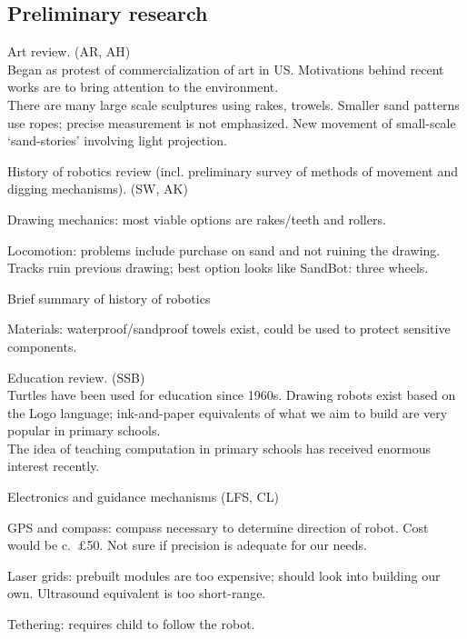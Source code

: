 \documentclass[a4paper,11pt,twoside,class=meetingmins,crop=false]{standalone}
\begin{document}
\begin{items}
\subsection{Preliminary research}
    \item Art review. (AR, AH)\\
        Began as protest of commercialization of art in US. Motivations behind recent works are to bring attention to the environment.\\
        There are many large scale sculptures using rakes, trowels. Smaller sand patterns use ropes; precise measurement is not emphasized. New movement of small-scale `sand-stories' involving light projection.
    \item History of robotics review (incl. preliminary survey of methods of movement and digging mechanisms). (SW, AK)
    \begin{subitems}
        \item Drawing mechanics: most viable options are rakes/teeth and rollers.
        \item Locomotion: problems include purchase on sand and not ruining the drawing. Tracks ruin previous drawing; best option looks like SandBot: three wheels.
        \item Brief summary of history of robotics
        \item Materials: waterproof/sandproof towels exist, could be used to protect sensitive components.
    \end{subitems}
    \item Education review. (SSB)\\
        Turtles have been used for education since 1960s. Drawing robots exist based on the Logo language; ink-and-paper equivalents of what we aim to build are very popular in primary schools.\\
        The idea of teaching computation in primary schools has received enormous interest recently.
    \item Electronics and guidance mechanisms (LFS, CL)
    \begin{subitems}
        \item GPS and compass: compass necessary to determine direction of robot. Cost would be c.~\pounds{50}. Not sure if precision is adequate for our needs.
        \item Laser grids: prebuilt modules are too expensive; should look into building our own. Ultrasound equivalent is too short-range.
        \item Tethering: requires child to follow the robot.

\end{subitems}
\end{items}
\end{document}
